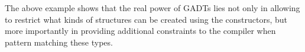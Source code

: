 The above example shows that the real power of GADTs lies not only in allowing to restrict what kinds of structures can be created using the constructors, but more importantly in providing additional constraints to the compiler when pattern matching these types.

%
%
%
%
%
%
%
%
%
%


